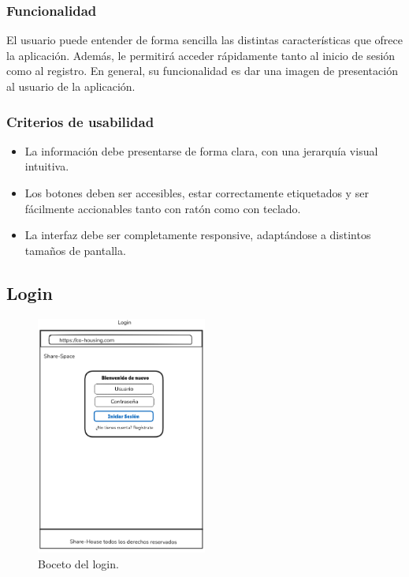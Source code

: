 \subsubsection{Funcionalidad}
El usuario puede entender de forma sencilla las distintas características que ofrece la aplicación. Además, le permitirá acceder rápidamente tanto al inicio de sesión como al registro. En general, su funcionalidad es dar una imagen de presentación al usuario de la aplicación.

\subsubsection{Criterios de usabilidad}
\begin{itemize}
  \item La información debe presentarse de forma clara, con una jerarquía visual intuitiva.
  \item Los botones deben ser accesibles, estar correctamente etiquetados y ser fácilmente accionables tanto con ratón como con teclado.
  \item La interfaz debe ser completamente responsive, adaptándose a distintos tamaños de pantalla.
\end{itemize}

\subsection{Login}
\begin{figure}[H]
    \centering
    \includegraphics[width=0.5\textwidth]{fotos/login-boceto.png}
    \caption{Boceto del login.}
    \label{fig:login-boceto}
\end{figure}
